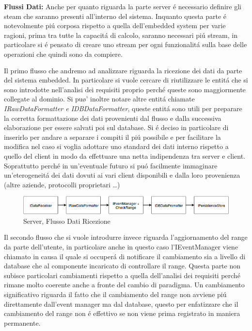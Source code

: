 \textbf{Flussi Dati:} Anche per quanto riguarda la parte server \'e necessario definire gli steam che saranno presenti all'interno del sistema. Inquanto questa parte \'e notevolmente pi\'u corposa rispetto a quella dell'embedded system per varie ragioni, prima tra tutte la capacit\'a di calcolo, saranno necessari pi\'u stream, in particolare si \'e pensato di creare uno stream per ogni funzionalit\'a sulla base delle operazioni che quindi sono da compiere.

Il primo flusso che andremo ad analizzare riguarda la ricezione dei dati da parte del sistema embedded. In particolare si vuole cercare di riutilizzare le entit\'a che si sono introdotte nell'analisi dei requisiti proprio perch\'e queste sono maggiormente collegate al dominio. Si pu\o' inoltre notare altre entit\'a chiamate \textit{IRawDataFormatter e IDBDataFormatter}, queste entit\'a sono utili per preparare la corretta formattazione dei dati provenienti dal flusso e dalla successiva elaborazione per essere salvati poi sul database. Si \'e deciso in particolare di inserirlo per andare a separare i compiti il pi\'u possibile e per facilitare la modifica nel caso si voglia adottare uno standard dei dati interno rispetto a quello del client in modo da effettuare una netta indipendenza tra server e client. Soprattutto perch\'e in un'eventuale futuro si pu\'o facilmente immaginare un'eterogeneit\'a dei dati dovuti ai vari client disponibili e dalla loro provenienza (altre aziende, protocolli proprietari \ldots)

\begin{figure}[h]
\centering
\includegraphics[width=\textwidth]{Figures/LogicArchitecture/Server/FlowDiagramReceiveData}
\caption{Server, Flusso Dati Ricezione}
\end{figure}

Il secondo flusso che si vuole introdurre invece riguarda l'aggiornamento del range da parte dell'utente, in particolare anche in questo caso l'IEventManager viene chiamato in causa il quale si occuper\'a di notificare il cambiamento sia a livello di database che al componente incaricato di controllare il range. Questa parte non subisce particolari cambiamenti rispetto a quella dell'analisi dei requisiti perch\'e rimane molto coerente anche a fronte del cambio di paradigma. Un cambiamento significativo riguarda il fatto che il cambiamento del range non avviene pi\'u direttamente dall'event manager ma dal database, questo per enfatizzare che il cambiamento del range non \'e effettivo se non viene prima registrato in maniera permanente.

